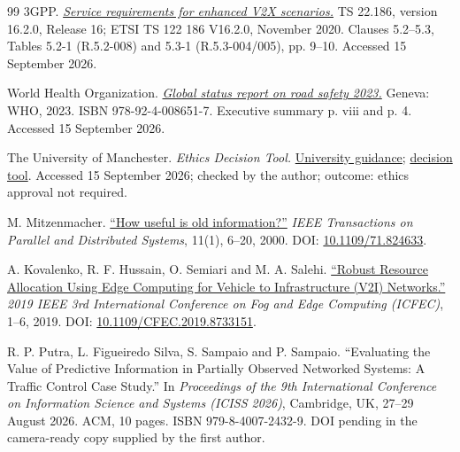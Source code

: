 \documentclass[12pt,a4paper]{article}
\begin{document}
\begin{thebibliography}{99}
 3GPP. \href{\detokenize{https://www.etsi.org/deliver/etsi_ts/122100_122199/122186/16.02.00_60/ts_122186v160200p.pdf}}{\emph{Service requirements for enhanced V2X scenarios.}} TS 22.186, version 16.2.0, Release 16; ETSI TS 122 186 V16.2.0, November 2020. Clauses 5.2--5.3, Tables 5.2-1 (R.5.2-008) and 5.3-1 (R.5.3-004/005), pp. 9--10. Accessed 15 September 2026.

 World Health Organization. \href{\detokenize{https://iris.who.int/server/api/core/bitstreams/46275f9f-ef66-4892-8ddd-a496ef8c1b74/content}}{\emph{Global status report on road safety 2023.}} Geneva: WHO, 2023. ISBN 978-92-4-008651-7. Executive summary p. viii and p. 4. Accessed 15 September 2026.

 The University of Manchester. \emph{Ethics Decision Tool.} \href{\detokenize{https://www.manchester.ac.uk/research/environment/governance/ethics/approval/}}{University guidance}; \href{\detokenize{https://www.training.itservices.manchester.ac.uk/uom/ERM/ethics_decision_tool/story.html}}{decision tool}. Accessed 15 September 2026; checked by the author; outcome: ethics approval not required.

 M. Mitzenmacher. \href{\detokenize{https://www.eecs.harvard.edu/~michaelm/NEWWORK/postscripts/oldinfo-jver-submit.pdf}}{``How useful is old information?''} \emph{IEEE Transactions on Parallel and Distributed Systems}, 11(1), 6--20, 2000. DOI: \href{\detokenize{https://doi.org/10.1109/71.824633}}{10.1109/71.824633}.

 A. Kovalenko, R. F. Hussain, O. Semiari and M. A. Salehi. \href{\detokenize{https://arxiv.org/abs/1905.04458v1}}{``Robust Resource Allocation Using Edge Computing for Vehicle to Infrastructure (V2I) Networks.''} \emph{2019 IEEE 3rd International Conference on Fog and Edge Computing (ICFEC)}, 1--6, 2019. DOI: \href{\detokenize{https://doi.org/10.1109/CFEC.2019.8733151}}{10.1109/CFEC.2019.8733151}.

 R. P. Putra, L. Figueiredo Silva, S. Sampaio and P. Sampaio. ``Evaluating the Value of Predictive Information in Partially Observed Networked Systems: A Traffic Control Case Study.'' In \emph{Proceedings of the 9th International Conference on Information Science and Systems (ICISS 2026)}, Cambridge, UK, 27--29 August 2026. ACM, 10 pages. ISBN 979-8-4007-2432-9. DOI pending in the camera-ready copy supplied by the first author.

\end{thebibliography}
\end{document}
